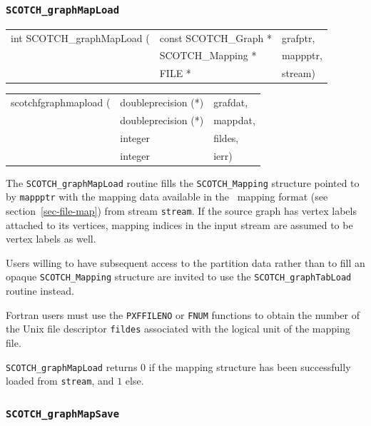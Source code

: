 \subsubsection{{\tt SCOTCH\_graphMapLoad}}
\label{sec-lib-graph-map-load}

\begin{itemize}
\progsyn

{\tt\begin{tabular}{l@{}ll}
int SCOTCH\_graphMapLoad ( & const SCOTCH\_Graph * & grafptr, \\
                           & SCOTCH\_Mapping *     & mappptr, \\
                           & FILE *                & stream)
\end{tabular}}

{\tt\begin{tabular}{l@{}ll}
scotchfgraphmapload ( & doubleprecision (*) & grafdat, \\
                      & doubleprecision (*) & mappdat, \\
                      & integer             & fildes,  \\
                      & integer             & ierr)
\end{tabular}}

\progdes

The {\tt SCOTCH\_graphMapLoad} routine fills the
{\tt SCOTCH\_\lbt Mapping} structure pointed to by
{\tt mappptr} with the mapping data available in
the \scotch\ mapping format (see section~\ref{sec-file-map})
from stream {\tt stream}. If the source graph has vertex labels
attached to its vertices, mapping indices in the input stream are
assumed to be vertex labels as well.

Users willing to have subsequent access to the partition data
rather than to fill an opaque {\tt SCOTCH\_\lbt Mapping} structure
are invited to use the {\tt SCOTCH\_\lbt graph\lbt Tab\lbt Load}
routine instead.

Fortran users must use the {\tt PXFFILENO} or {\tt FNUM} functions to
obtain the number of the Unix file descriptor {\tt fildes} associated
with the logical unit of the mapping file.

\progret

{\tt SCOTCH\_graphMapLoad} returns $0$ if the mapping structure
has been successfully loaded from {\tt stream}, and $1$ else.
\end{itemize}

\subsubsection{{\tt SCOTCH\_graphMapSave}}

